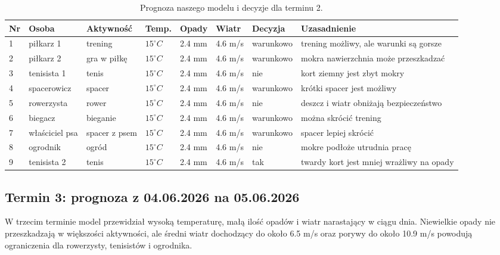 \documentclass[a4paper,12pt]{article}
\begin{document}
\begin{table}[H]
\centering
\scriptsize
\begin{tabular}{p{0.5cm}p{1.7cm}p{2.0cm}p{1.4cm}p{1.3cm}p{1.2cm}p{1.5cm}p{2.3cm}}
\toprule
\textbf{Nr} & \textbf{Osoba} & \textbf{Aktywność} & \textbf{Temp.} & \textbf{Opady} & \textbf{Wiatr} & \textbf{Decyzja} & \textbf{Uzasadnienie} \\
\midrule
1 & piłkarz 1 & trening & $15^\circ C$ & 2.4 mm & 4.6 m/s & warunkowo & trening możliwy, ale warunki są gorsze \\[12pt]
2 & piłkarz 2 & gra w piłkę & $15^\circ C$ & 2.4 mm & 4.6 m/s & warunkowo & mokra nawierzchnia może przeszkadzać \\[12pt]
3 & tenisista 1 & tenis & $15^\circ C$ & 2.4 mm & 4.6 m/s & nie & kort ziemny jest zbyt mokry \\[12pt]
4 & spacerowicz & spacer & $15^\circ C$ & 2.4 mm & 4.6 m/s & warunkowo & krótki spacer jest możliwy \\[12pt]
5 & rowerzysta & rower & $15^\circ C$ & 2.4 mm & 4.6 m/s & nie & deszcz i wiatr obniżają bezpieczeństwo \\[12pt]
6 & biegacz & bieganie & $15^\circ C$ & 2.4 mm & 4.6 m/s & warunkowo & można skrócić trening \\[12pt]
7 & właściciel psa & spacer z psem & $15^\circ C$ & 2.4 mm & 4.6 m/s & warunkowo & spacer lepiej skrócić \\[12pt]
8 & ogrodnik & ogród & $15^\circ C$ & 2.4 mm & 4.6 m/s & nie & mokre podłoże utrudnia pracę \\[12pt]
9 & tenisista 2 & tenis & $15^\circ C$ & 2.4 mm & 4.6 m/s & tak & twardy kort jest mniej wrażliwy na opady \\
\bottomrule
\end{tabular}
\caption{Prognoza naszego modelu i decyzje dla terminu 2.}
\end{table}

\subsection{Termin 3: prognoza z 04.06.2026 na 05.06.2026}

W trzecim terminie model przewidział wysoką temperaturę, małą ilość opadów i
wiatr narastający w ciągu dnia. Niewielkie opady nie przeszkadzają w większości
aktywności, ale średni wiatr dochodzący do około 6.5 m/s oraz porywy do około
10.9 m/s powodują ograniczenia dla rowerzysty, tenisistów i ogrodnika.
\end{document}
